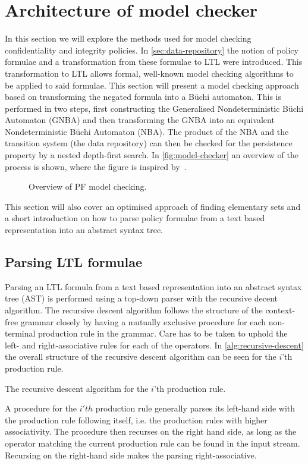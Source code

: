 \section{Architecture of model checker}\label{sec:methods}
In this section we will explore the methods used for model checking confidentiality and integrity policies. In \autoref{sec:data-repository} the notion of policy formulae and a transformation from these formulae to LTL were introduced. This transformation to LTL allows formal, well-known model checking algorithms to be applied to said formulae. This section will present a model checking approach based on transforming the negated formula into a Büchi automaton. This is performed in two steps, first constructing the Generalised Nondeterministic Büchi Automaton (GNBA) and then transforming the GNBA into an equivalent Nondeterministic Büchi Automaton (NBA). The product of the NBA and the transition system (the data repository) can then be checked for the persistence property by a nested depth-first search. In \autoref{fig:model-checker} an overview of the process is shown, where the figure is inspired by~\cite[Fig.~5.16]{baier2008principles}.

\begin{figure}[!ht]
    \centering
    
    \caption{Overview of PF model checking.}
    \label{fig:model-checker}
\end{figure}

This section will also cover an optimised approach of finding elementary sets and a short introduction on how to parse policy formulae from a text based representation into an abstract syntax tree.

\subsection{Parsing LTL formulae}
Parsing an LTL formula from a text based representation into an abstract syntax tree (AST) is performed using a top-down parser with the recursive decent algorithm. The recursive descent algorithm follows the structure of the context-free grammar closely by having a mutually exclusive procedure for each non-terminal production rule in the grammar. Care has to be taken to uphold the left- and right-associative rules for each of the operators. In \autoref{alg:recursive-descent} the overall structure of the recursive descent algorithm can be seen for the $i$'th production rule.
\begin{algorithm}[H]
\SetAlgoLined
\DontPrintSemicolon
{}

\caption{The recursive descent algorithm for the $i$'th production rule.}
\label{alg:recursive-descent}
\end{algorithm}
A procedure for the $i'th$ production rule generally parses its left-hand side with the production rule following itself, i.e. the production rules with higher associativity. The procedure then recurses on the right hand side, as long as the operator matching the current production rule can be found in the input stream. Recursing on the right-hand side makes the parsing right-associative. 

